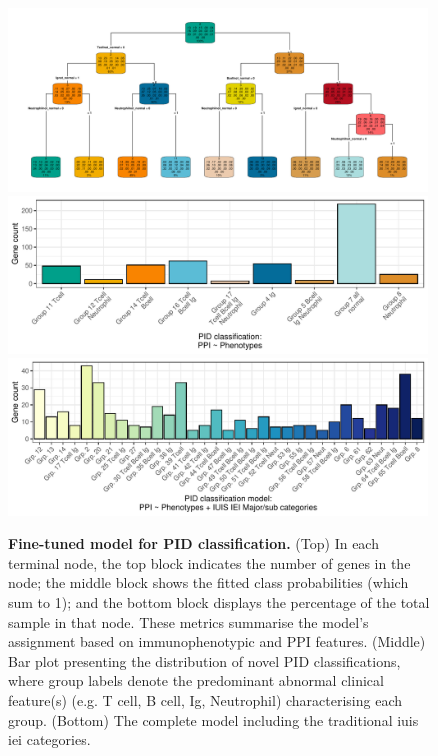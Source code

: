 \begin{figure}[ht]
  \centering
  \includegraphics[width=0.99\textwidth]{../images/p_new_classification_finetune_tree.pdf}       
  \includegraphics[width=0.99\textwidth]{../images/plot_new_pid_classifications_genetic.pdf}
  \includegraphics[width=0.99\textwidth]{../images/plot_multicat_new_pid_classes_combined.pdf}
  \caption{\textbf{ Fine-tuned model for PID classification.} 
  (Top) In each terminal node, the top block indicates the number of genes in the node; the middle block shows the fitted class probabilities (which sum to 1); and the bottom block displays the percentage of the total sample in that node. These metrics summarise the model's assignment based on immunophenotypic and PPI features. (Middle) Bar plot presenting the distribution of novel PID classifications, where group labels denote the predominant abnormal clinical feature(s) (e.g. T cell, B cell, Ig, Neutrophil) characterising each group. (Bottom) The complete model including the traditional \ac{iuis} \ac{iei} categories.}  
  \label{fig:pid_class_tree_distribution}
\end{figure}

